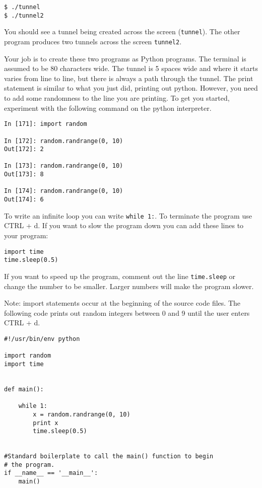 \documentclass[12pt]{article}
\begin{document}
\begin{lstlisting}[style=c]
$ ./tunnel
$ ./tunnel2
\end{lstlisting}

You should see a tunnel being created across the screen (\texttt{tunnel}). The other program produces two tunnels across the screen \texttt{tunnel2}.

Your job is to create these two programs as Python programs. The terminal is assumed to be 80 characters wide. The tunnel is 5 spaces wide and where it starts varies from line to line, but there is always a path through the tunnel. The print statement is similar to what you just did, printing out python. However, you need to add some randomness to the line you are printing. To get you started, experiment with the following command on the python interpreter. 


\begin{lstlisting}[style=bash]
In [171]: import random

In [172]: random.randrange(0, 10)
Out[172]: 2

In [173]: random.randrange(0, 10)
Out[173]: 8

In [174]: random.randrange(0, 10)
Out[174]: 6
\end{lstlisting}

To write an infinite loop you can write \texttt{while 1:}. To terminate the program use CTRL + d. If you want to slow the program down you can add these lines to your program:

\begin{lstlisting}[style=c]
import time
time.sleep(0.5)
\end{lstlisting}

If you want to speed up the program, comment out the line \texttt{time.sleep} or change the number to be smaller. Larger numbers will make the program slower.

Note: import statements occur at the beginning of the source code files. The following code prints out random integers between 0 and 9 until the user enters CTRL + d.

\begin{lstlisting}[style=c]
#!/usr/bin/env python

import random
import time


def main():

    while 1:
        x = random.randrange(0, 10)
        print x
        time.sleep(0.5)


#Standard boilerplate to call the main() function to begin
# the program.
if __name__ == '__main__':
    main()
\end{lstlisting}
\end{document}
